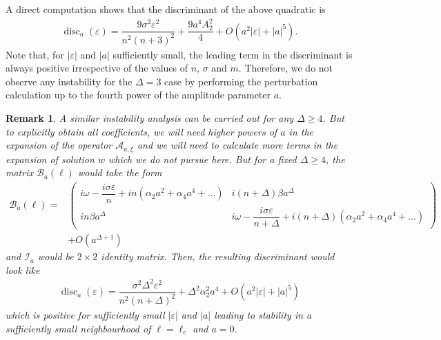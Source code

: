 \documentclass[12pt]{amsart}    %
\renewcommand{\geq}{\geqslant}
\renewcommand{\leq}{\leqslant}
\newtheorem{remark}[theorem]{Remark}
\numberwithin{equation}{section}
\begin{document}
A direct computation shows that the discriminant of the above quadratic is
\begin{align*}
    \operatorname{disc}_a(\varepsilon) = \dfrac{9\sigma^2\varepsilon^2}{n^2(n+3)^2}+\dfrac{9 a^4A_2^2}{4}+O(a^2|\varepsilon|+ |a|^5).
\end{align*}
Note that, for $|\varepsilon|$ and $|a|$ sufficiently small, the leading term in the discriminant is always positive irrespective of the values of $n$, $\sigma$ and $m$. Therefore, we do not observe any instability for the $\Delta =3$ case by performing the perturbation calculation up to the fourth power of the amplitude parameter $a$. 


\begin{remark}\label{rem:Delta4}
A similar instability analysis can be carried out for any $\Delta \geq 4$. But to explicitly obtain all coefficients, we will need higher powers of $a$ in the expansion of the operator $\mathcal A_{a,\xi}$ and we will need to calculate more terms in the expansion of solution $w$ which we do not pursue here. But for a fixed $\Delta\geq 4$, the matrix $\mathcal{B}_a(\ell)$ would take the form
\begin{align*}
	\mathcal{B}_{a}(\ell) = & \begin{pmatrix}
		i\omega-\dfrac{i\sigma\varepsilon}{n}+in(\alpha_2a^2+\alpha_4a^4+\dots) &
		i(n+\Delta)\beta a^{\Delta}\\
		in\beta a^{\Delta} & 
		i\omega-\dfrac{i\sigma\varepsilon}{n+\Delta}+i(n+\Delta)(\alpha_2a^2+\alpha_4a^4+\dots)
	\end{pmatrix}\\
	&+O(a^{\Delta+1})
\end{align*}
and $\mathcal{I}_a$ would be $2\times 2$ identity matrix. Then, the resulting discriminant would look like
\begin{align*}
    \operatorname{disc}_a(\varepsilon) = \dfrac{\sigma^2 \Delta^2 \varepsilon^2}{n^2(n+\Delta)^2}+\Delta ^2\alpha_2^2a^4+O(a^2|\varepsilon|+ |a|^5)
\end{align*}
which is positive for sufficiently small $|\varepsilon|$ and $|a|$ leading to stability in a sufficiently small neighbourhood of $\ell=\ell_c$ and $a=0$. 
\end{remark}

\end{document}
